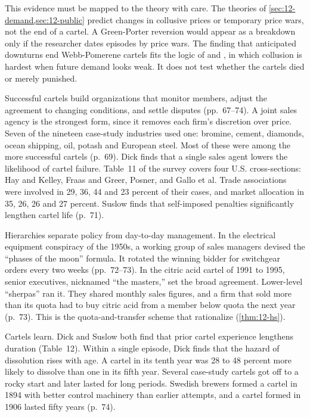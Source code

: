 This evidence must be mapped to the theory with care. The theories of \cref{sec:12-demand,sec:12-public} predict
changes in collusive prices or temporary price wars, not the end of a cartel. A Green-Porter reversion would appear as
a breakdown only if the researcher dates episodes by price wars. The finding that anticipated downturns end
Webb-Pomerene cartels fits the logic of \citet{HaltiwangerHarrington1991} and \citet{BagwellStaiger1997}, in which
collusion is hardest when future demand looks weak. It does not test whether the cartels died or merely punished.

Successful cartels build organizations that monitor members, adjust the agreement to changing conditions, and settle
disputes (pp.~67--74). A joint sales agency is the strongest form, since it removes each firm's discretion over price.
Seven of the nineteen case-study industries used one: bromine, cement, diamonds, ocean shipping, oil, potash and
European steel. Most of these were among the more successful cartels (p.~69). Dick finds that a single sales agent
lowers the likelihood of cartel failure. Table~11 of the survey covers four U.S. cross-sections: Hay and Kelley,
Fraas and Greer, Posner, and Gallo et al. Trade associations were involved in 29, 36, 44 and 23 percent of their cases,
and market allocation in 35, 26, 26 and 27 percent. Suslow finds that self-imposed penalties significantly lengthen
cartel life (p.~71).

Hierarchies separate policy from day-to-day management. In the electrical equipment conspiracy of the 1950s, a working
group of sales managers devised the ``phases of the moon'' formula. It rotated the winning bidder for switchgear orders
every two weeks (pp.~72--73). In the citric acid cartel of 1991 to 1995, senior executives, nicknamed ``the
masters,'' set the broad agreement. Lower-level ``sherpas'' ran it. They shared monthly sales figures, and a firm that
sold more than its quota had to buy citric acid from a member below quota the next year (p.~73). This is the
quota-and-transfer scheme that \citet{HarringtonSkrzypacz2011} rationalize (\cref{thm:12-hs}).

Cartels learn. Dick and Suslow both find that prior cartel experience lengthens duration (Table~12). Within a single
episode, Dick finds that the hazard of dissolution rises with age. A cartel in its tenth year was 28 to 48 percent more
likely to dissolve than one in its fifth year. Several case-study cartels got off to a rocky start and later lasted for
long periods. Swedish brewers formed a cartel in 1894 with better control machinery than earlier attempts, and a
cartel formed in 1906 lasted fifty years (p.~74).

